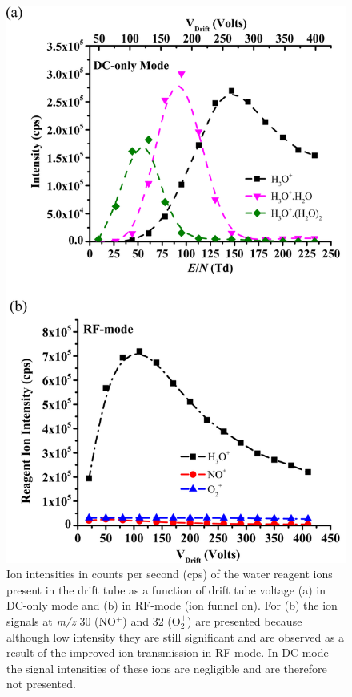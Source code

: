 \begin{figure}%
\centering
\includegraphics[height=0.7\textheight]{pics/RFpaper_fig2.png}
\caption{Ion intensities in counts per second (cps) of the water reagent ions present in the drift tube as a function of drift tube voltage (a) in DC-only mode and (b) in RF-mode (ion funnel on). For (b) the ion signals at \textit{m/z} 30 (NO$^+$) and 32 (O$_2^+$) are presented because
although low intensity they are still significant and are observed as a result of the improved ion transmission in RF-mode. In DC-mode the signal intensities of these ions are negligible and are therefore not presented.}
\label{fig:RF2}
\end{figure}

